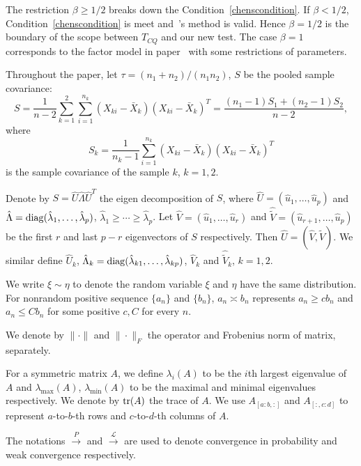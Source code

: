 The restriction $\beta\geq 1/2$ breaks down the Condition~\eqref{chenscondition}. If $\beta< 1/2$, Condition~\eqref{chenscondition} is meet and~\cite{Chen2010A}'s  method is valid. 
 Hence $\beta=1/2$ is the boundary of the scope between $T_{CQ}$ and our new test.
The case $\beta=1$ corresponds to the factor model in paper~\cite{Ma2015A} with some restrictions of parameters.

Throughout the paper, let $\tau={(n_1+n_2)}/{(n_1n_2)}$, $S$ be the pooled sample covariance:
\begin{equation*}
S=\frac{1}{n-2}\sum_{k=1}^2\sum_{i=1}^{n_k} (X_{ki}-\bar{X}_k) {(X_{ki}-\bar{X}_k)}^T
    =\frac{(n_1-1)S_1+(n_2-1)S_2}{n-2},
\end{equation*}
where
\begin{equation*}
S_k=\frac{1}{n_k -1}\sum_{i=1}^{n_k} (X_{ki}-\bar{X}_k) {(X_{ki}-\bar{X}_k)}^T
\end{equation*}
is the sample covariance  of the sample $k$, $k=1,2$.

    Denote by $S=\hat{U}\hat{\Lambda}\hat{U}^T$ the eigen decomposition of $S$, where $\hat{U}=(\hat{u}_1,\ldots,\hat{u}_p)$ and  $\hat{\Lambda}=\operatorname{diag}(\hat{\lambda}_1,\ldots,\hat{\lambda}_p)$, $\hat{\lambda}_{1}\geq\cdots \geq \hat{\lambda}_p$. 
Let $\hat{V}=(\hat{u}_1,\ldots,\hat{u}_r)$ and $\hat{\tilde{V}}=(\hat{u}_{r+1},\ldots,\hat{u}_p)$ be the first $r$ and last $p-r$ eigenvectors of $S$ respectively. Then $\hat{U}=(\hat{V},\hat{\tilde{V}})$.
We similar define $\hat{U}_k$, $\hat{\Lambda}_k=\operatorname{diag}(\hat{\lambda}_{k1},\ldots,\hat{\lambda}_{kp})$, $\hat{V}_k$ and $\hat{\tilde{V}}_k$, $k=1,2$.


We write $\xi\sim \eta$ to denote the random variable $\xi$ and $\eta$ have the same distribution.
For nonrandom positive sequence $\{a_n\}$ and $\{b_n\}$, $a_n\asymp b_n$ represents $a_n\geq cb_n$ and $a_n\leq Cb_n$ for some positive $c,C$ for every $n$.

We denote by $\|\cdot \|$ and $\|\cdot\|_F$ the operator and Frobenius  norm of matrix, separately.

For a symmetric matrix $A$, we define $\lambda_i(A)$ to be the $i$th largest eigenvalue of $A$ and $\lambda_{\max}(A)$, $\lambda_{\min}(A)$ to be the maximal and minimal eigenvalues respectively.
We denote by $\operatorname{tr}(A)$ the trace of $A$.
We use $A_{[a:b,:]}$ and $A_{[:,c:d]}$ to represent $a$-to-$b$-th rows and $c$-to-$d$-th columns of $A$.

The notations $\xrightarrow{P}$ and $\xrightarrow{\mathcal{L}}$ are used to denote convergence in probability and weak convergence respectively.

